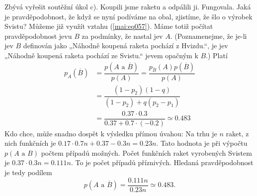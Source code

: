\begin{mdframed}[style=mdexam]
\begin{example}
      Zbývá vyřešit soutěžní úkol c). Koupili jsme raketu a odpálili ji. Fungovala. Jaká je
      pravděpodobnost, že když se nyní podíváme na obal, zjistíme, že šlo o výrobek Svistu? Můžeme
      již využít vztahu (\ref{mai:eq057}). Máme totiž počítat pravděpodobnost jevu \(B\) za
      podmínky, že nastal jev \(A\). (Poznamenejme, že je-li jev \(B\) definován jako „Náhodně
      koupená raketa pochází z Hvizdu.“, je jev „Náhodně koupená raketa pochází ze Svistu.“ jevem
      opačným k \(B\).) Platí
      \begin{align*}
        p_A(\overline{B})&= \dfrac{p(A\text{ a }\overline{B})}{p(A)}
                          = \dfrac{p_{\overline{B}}(A)p(\overline{B})}{p(A)}                \\             
                         &= \dfrac{(1 - p_2)(1 - q)}{(1 - p_2) + q(p_2 - p_1)}              \\
                         &= \dfrac{\num{0.37}\cdot\num{0.3}}{\num{0.37} + \num{0.7}\cdot(\num{-0.2})}
                          \simeq\num{0.483}
      \end{align*}
      Kdo chce, může snadno dospět k výsledku přímou úvahou: Na trhu je \(n\) raket, z nich
      funkčních je \(\num{0.17}\cdot\num{0.7}n + \num{0.37} - \num{0.3}n = \num{0.23}n\). Tato
      hodnota je při výpočtu \(p(A\text{ a }B)\)  počtem případů možných. Počet funkčních raket
      vyrobených Svistem je \(\num{0.37}\cdot\num{0.3}n = \num{0.111}n\). To je počet případů
      příznivých. Hledaná pravděpodobnost je tedy podílem
      \begin{equation*}
        p(A\text{ a }\overline{B}) = \dfrac{\num{0.111}n}{\num{0.23}n}\simeq\num{0.483}.
      \end{equation*}
  \end{example}
\end{mdframed}